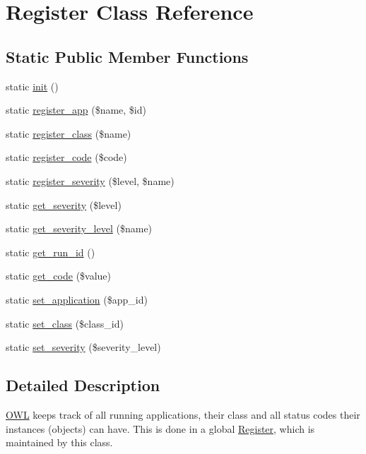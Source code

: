 \hypertarget{classRegister}{
\section{Register Class Reference}
\label{classRegister}
}
\subsection*{Static Public Member Functions}
\begin{CompactItemize}
\item 
static \hyperlink{classRegister_5c34c30e9e6ce4dea2dbb02f55e9278a}{init} ()
\item 
static \hyperlink{classRegister_c547568c4a7272fdaf65cb2825eccec3}{register\_\-app} (\$name, \$id)
\item 
static \hyperlink{classRegister_58300f74d002f1306a03baf12af0f02c}{register\_\-class} (\$name)
\item 
static \hyperlink{classRegister_875fd1f32f0746aa9e0e00b053c7389a}{register\_\-code} (\$code)
\item 
static \hyperlink{classRegister_c22a104eefa471675cb28ee20821eaad}{register\_\-severity} (\$level, \$name)
\item 
static \hyperlink{classRegister_e71e10bddb03483b54ad22b9edb95b7c}{get\_\-severity} (\$level)
\item 
static \hyperlink{classRegister_70490e59a4a3b910d259b8a4287c3e91}{get\_\-severity\_\-level} (\$name)
\item 
static \hyperlink{classRegister_041706fafb409a31f125d2075501e82e}{get\_\-run\_\-id} ()
\item 
static \hyperlink{classRegister_363389530273f40c3b20666bbff75e05}{get\_\-code} (\$value)
\item 
static \hyperlink{classRegister_d4d61787414f7d64d1e3420f0fdf3f91}{set\_\-application} (\$app\_\-id)
\item 
static \hyperlink{classRegister_58e49ccb1fe4e441d0329e879c922aa0}{set\_\-class} (\$class\_\-id)
\item 
static \hyperlink{classRegister_0adde8d67d77b9b4d66156272cb48ae4}{set\_\-severity} (\$severity\_\-level)
\end{CompactItemize}


\subsection{Detailed Description}
\hyperlink{classOWL}{OWL} keeps track of all running applications, their class and all status codes their instances (objects) can have. This is done in a global \hyperlink{classRegister}{Register}, which is maintained by this class. 

